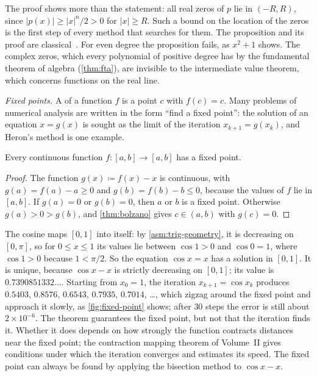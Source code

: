 The proof shows more than the statement: all real zeros of $p$ lie in $(-R,R)$, since $|p(x)|\ge|x|^n/2>0$ for $|x|\ge R$. Such a bound on the location of the zeros is the first step of every method that searches for them. The proposition and its proof are classical~\cite{spivak2008calculus}. For even degree the proposition fails, as $x^2+1$ shows. The complex zeros, which every polynomial of positive degree has by the fundamental theorem of algebra (\cref{thm:fta}), are invisible to the intermediate value theorem, which concerns functions on the real line.

\emph{Fixed points.} A  of a function $f$ is a point $c$ with $f(c)=c$. Many problems of numerical analysis are written in the form ``find a fixed point'': the solution of an equation $x=g(x)$ is sought as the limit of the iteration $x_{k+1}=g(x_k)$, and Heron's method is one example.

\begin{theorem}
\label{thm:fixed-point}
Every continuous function $f\colon[a,b]\to[a,b]$ has a fixed point.
\end{theorem}

\begin{proof}
The function $g(x)\coloneqq f(x)-x$ is continuous, with $g(a)=f(a)-a\ge0$ and $g(b)=f(b)-b\le0$, because the values of $f$ lie in $[a,b]$. If $g(a)=0$ or $g(b)=0$, then $a$ or $b$ is a fixed point. Otherwise $g(a)>0>g(b)$, and \cref{thm:bolzano} gives $c\in(a,b)$ with $g(c)=0$.
\end{proof}

The cosine maps $[0,1]$ into itself: by \cref{asm:trig-geometry}, it is decreasing on $[0,\pi]$, so for $0\le x\le1$ its values lie between $\cos1>0$ and $\cos0=1$, where $\cos1>0$ because $1<\pi/2$. So the equation $\cos x=x$ has a solution in $[0,1]$. It is unique, because $\cos x-x$ is strictly decreasing on $[0,1]$; its value is $0.7390851332\ldots$. Starting from $x_0=1$, the iteration $x_{k+1}=\cos x_k$ produces $0.5403$, $0.8576$, $0.6543$, $0.7935$, $0.7014$, \ldots, which zigzag around the fixed point and approach it slowly, as \cref{fig:fixed-point} shows; after $30$ steps the error is still about $2\times10^{-6}$. The theorem guarantees the fixed point, but not that the iteration finds it. Whether it does depends on how strongly the function contracts distances near the fixed point; the contraction mapping theorem of Volume~II gives conditions under which the iteration converges and estimates its speed. The fixed point can always be found by applying the bisection method to $\cos x-x$.

